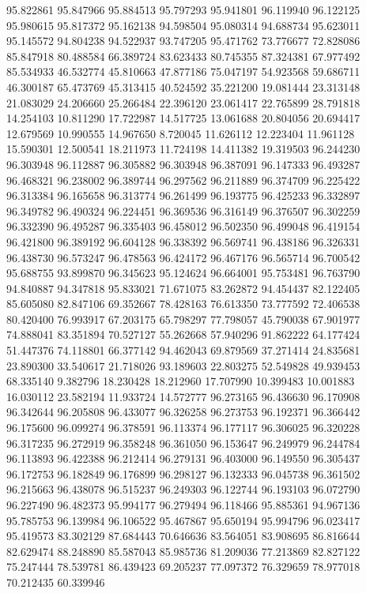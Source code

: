 95.822861
95.847966
95.884513
95.797293
95.941801
96.119940
96.122125
95.980615
95.817372
95.162138
94.598504
95.080314
94.688734
95.623011
95.145572
94.804238
94.522937
93.747205
95.471762
73.776677
72.828086
85.847918
80.488584
66.389724
83.623433
80.745355
87.324381
67.977492
85.534933
46.532774
45.810663
47.877186
75.047197
54.923568
59.686711
46.300187
65.473769
45.313415
40.524592
35.221200
19.081444
23.313148
21.083029
24.206660
25.266484
22.396120
23.061417
22.765899
28.791818
14.254103
10.811290
17.722987
14.517725
13.061688
20.804056
20.694417
12.679569
10.990555
14.967650
8.720045
11.626112
12.223404
11.961128
15.590301
12.500541
18.211973
11.724198
14.411382
19.319503
96.244230
96.303948
96.112887
96.305882
96.303948
96.387091
96.147333
96.493287
96.468321
96.238002
96.389744
96.297562
96.211889
96.374709
96.225422
96.313384
96.165658
96.313774
96.261499
96.193775
96.425233
96.332897
96.349782
96.490324
96.224451
96.369536
96.316149
96.376507
96.302259
96.332390
96.495287
96.335403
96.458012
96.502350
96.499048
96.419154
96.421800
96.389192
96.604128
96.338392
96.569741
96.438186
96.326331
96.438730
96.573247
96.478563
96.424172
96.467176
96.565714
96.700542
95.688755
93.899870
96.345623
95.124624
96.664001
95.753481
96.763790
94.840887
94.347818
95.833021
71.671075
83.262872
94.454437
82.122405
85.605080
82.847106
69.352667
78.428163
76.613350
73.777592
72.406538
80.420400
76.993917
67.203175
65.798297
77.798057
45.790038
67.901977
74.888041
83.351894
70.527127
55.262668
57.940296
91.862222
64.177424
51.447376
74.118801
66.377142
94.462043
69.879569
37.271414
24.835681
23.890300
33.540617
21.718026
93.189603
22.803275
52.549828
49.939453
68.335140
9.382796
18.230428
18.212960
17.707990
10.399483
10.001883
16.030112
23.582194
11.933724
14.572777
96.273165
96.436630
96.170908
96.342644
96.205808
96.433077
96.326258
96.273753
96.192371
96.366442
96.175600
96.099274
96.378591
96.113374
96.177117
96.306025
96.320228
96.317235
96.272919
96.358248
96.361050
96.153647
96.249979
96.244784
96.113893
96.422388
96.212414
96.279131
96.403000
96.149550
96.305437
96.172753
96.182849
96.176899
96.298127
96.132333
96.045738
96.361502
96.215663
96.438078
96.515237
96.249303
96.122744
96.193103
96.072790
96.227490
96.482373
95.994177
96.279494
96.118466
95.885361
94.967136
95.785753
96.139984
96.106522
95.467867
95.650194
95.994796
96.023417
95.419573
83.302129
87.684443
70.646636
83.564051
83.908695
86.816644
82.629474
88.248890
85.587043
85.985736
81.209036
77.213869
82.827122
75.247444
78.539781
86.439423
69.205237
77.097372
76.329659
78.977018
70.212435
60.339946
